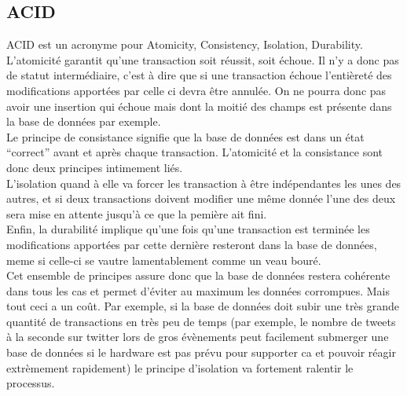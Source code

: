 \documentclass[11pt]{article}
\begin{document}
\subsection{ACID}
ACID est un acronyme pour Atomicity, Consistency, Isolation, Durability. L'atomicité garantit qu'une transaction soit réussit, soit échoue. Il n'y a donc pas de statut intermédiaire, c'est à dire que si une transaction échoue l'entièreté des modifications apportées par celle ci devra être annulée. On ne pourra donc pas avoir une insertion qui échoue mais dont la moitié des champs est présente dans la base de données par exemple. \\
Le principe de consistance signifie que la base de données est dans un état ``correct'' avant et après chaque transaction. L'atomicité et la consistance sont donc deux principes intimement liés. \\
L'isolation quand à elle va forcer les transaction à être indépendantes les unes des autres, et si deux transactions doivent modifier une même donnée l'une des deux sera mise en attente jusqu'à ce que la pemière ait fini. \\
Enfin, la durabilité implique qu'une fois qu'une transaction est terminée les modifications apportées par cette dernière resteront dans la base de données, meme si celle-ci se vautre lamentablement comme un veau bouré. \\
Cet ensemble de principes assure donc que la base de données restera cohérente dans tous les cas et permet d'éviter au maximum les données corrompues. Mais tout ceci a un coût. Par exemple, si la base de données doit subir une très grande quantité de transactions en très peu de temps (par exemple, le nombre de tweets à la seconde sur twitter lors de gros évènements peut facilement submerger une base de données si le hardware est pas prévu pour supporter ca et pouvoir réagir extrèmement rapidement) le principe d'isolation va fortement ralentir le processus.
\end{document}
